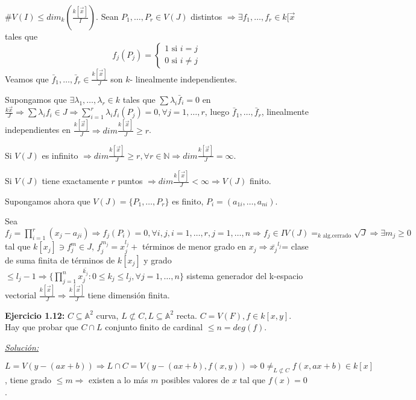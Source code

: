 \begin{Dem}
  $\# V(I) \le dim_k ( \frac{k[\vec{x}]}{I})$. Sean $P_1,\dots,P_r \in V(J)$ distintos $\Rightarrow \exists f_1,\dots,f_r \in k[\vec{x}$ tales que
\begin{equation*}
  f_j(P_j)= \left\{\begin{array}{ll}
    1 \text{ si } i=j \\
    0 \text{ si } i\neq j
    \end{array} \right.
\end{equation*}
Veamos que $\bar{f}_1,\dots,\bar{f}_r\in \frac{k[\vec{x}]}{J}$ son $k$- linealmente independientes.

Supongamos que $\exists \lambda_1,\dots, \lambda_r\in k$ tales que $\sum \lambda_i \bar{f}_i =0$ en $\frac{k{\vec{x}}}{J} \Rightarrow \sum \lambda_if_i \in J \Rightarrow \sum_{i=1}^r\lambda_i f_i(P_j)=0, \forall j=1,\dots,r$, luego $\bar{f}_1,\dots, \bar{f}_r$, linealmente independientes en $\frac{k[\vec{x}]}{J}\Rightarrow dim \frac{k[\vec{x}]}{J} \ge r$.

Si $V(J)$ es infinito $\Rightarrow dim \frac{k[\vec{x}]}{J} \ge r, \forall r \in \mathbb{N} \Rightarrow dim \frac{k[\vec{x}]}{J}=\infty$.

Si $V(J)$ tiene exactamente $r$ puntos $\Rightarrow dim \frac{k[\vec{x}]}{J}<\infty \Rightarrow V(J)$ finito.

Supongamos ahora que $V(J)=\{P_1,\dots, P_r \}$ es finito, $P_i=(a_{1i},\dots,a_{ni})$.

Sea $f_j=\prod_{i=1}^r (x_j-a_{ji}) \Rightarrow f_j(P_i)=0, \forall i,j, i=1,\dots, r, j=1,\dots, n \Rightarrow f_j\in IV(J)=_{k\text{ alg.cerrado}}\sqrt{J} \Rightarrow \exists m_j \ge 0$ tal que $k[x_j] \ni f^m_j\in J$, $f_j^{m_j}=x_j^{l_j}+$ términos de menor grado en $x_j \Rightarrow \bar{x_j}^{l_j}$= clase de suma finita de términos de $k[x_j]$ y grado $\le l_j-1  \Rightarrow \{\prod_{j=1}^n x_j^{\bar{k_j}}: 0\le k_j \le l_j,\forall j=1,\dots, n \}$ sistema generador del k-espacio vectorial $\frac{k[\vec{x}]}{J} \Rightarrow \frac{k[\vec{x}]}{J}$ tiene dimensión finita.
\end{Dem}

\textbf{Ejercicio 1.12: } $C\subseteq \mathbb{A}^2$ curva, $L\not \subset C, L\subseteq \mathbb{A}^2$ recta. $C=V(F),f\in k[x,y]$. Hay que probar que $C\cap L$ conjunto finito de cardinal $\le n= deg(f)$.

\underline{\textit{Solución: }}

$L=V(y-(ax+b)) \Rightarrow L\cap C = V(y-(ax+b),f(x,y)) \Rightarrow  0 \neq_{L\not \subset C} f(x,ax+b)\in k[x]$, tiene grado $\le m\Rightarrow $ existen a lo más $m$ posibles valores de $x$ tal que $f(x)=0$.

